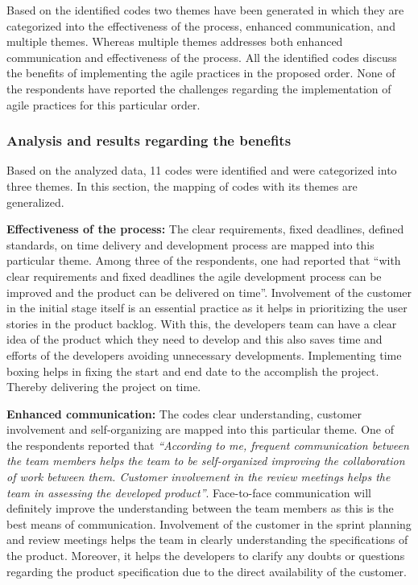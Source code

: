\documentclass[a4paper,oneside]{bth}
\begin{document}
Based on the identified codes two themes have been generated in which they are categorized into the effectiveness of the process, enhanced communication, and multiple themes. Whereas multiple themes addresses both enhanced communication and effectiveness of the process. All the identified codes discuss the benefits of implementing the agile practices in the proposed order. None of the respondents have reported the challenges regarding the implementation of agile practices for this particular order.
\subsubsection{Analysis and results regarding the benefits}
Based on the analyzed data, 11 codes were identified and were categorized into three themes. In this section, the mapping of codes with its themes are generalized.

\textbf{Effectiveness of the process:} The clear requirements, fixed deadlines, defined standards, on time delivery and development process are mapped into this particular theme. Among three of the respondents, one had reported that “with clear requirements and fixed deadlines the agile development process can be improved and the product can be delivered on time”. Involvement of the customer in the initial stage itself is an essential practice as it helps in prioritizing the user stories in the product backlog. With this, the developers team can have a clear idea of the product which they need to develop and this also saves time and efforts of the developers avoiding unnecessary developments. Implementing time boxing helps in fixing the start and end date to the accomplish the project. Thereby delivering the project on time.

\textbf{Enhanced communication:} The codes clear understanding, customer involvement and self-organizing are mapped into this particular theme. One of the respondents reported that \textit{“According to me, frequent communication between the team members helps the team to be self-organized improving the collaboration of work between them. Customer involvement in the review meetings helps the team in assessing the developed product”}. Face-to-face communication will definitely improve the understanding between the team members as this is the best means of communication. Involvement of the customer in the sprint planning and review meetings helps the team in clearly understanding the specifications of the product. Moreover, it helps the developers to clarify any doubts or questions regarding the product specification due to the direct availability of the customer.
\end{document}
